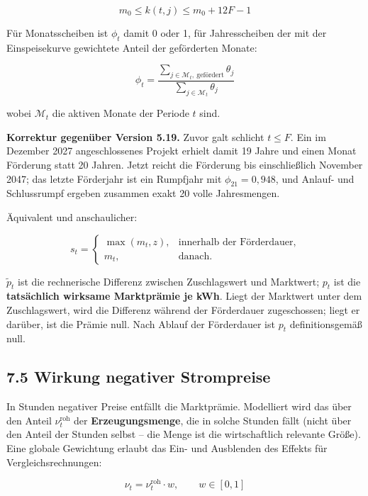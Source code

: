 \documentclass[
  a4paper,
  10pt]{article}
\renewenvironment{quote}
  {\begin{tcolorbox}[
      enhanced,
      breakable,
      colback=Wash,
      colframe=Brand,
      boxrule=0pt,
      leftrule=2.2pt,
      arc=0pt,
      left=8pt,right=8pt,top=6pt,bottom=6pt,
      before skip=8pt,after skip=9pt
    ]\small\color{InkSoft}}
  {\end{tcolorbox}}
\begin{document}
\[ m_0 \leq k(t,j) \leq m_0 + 12F - 1 \]

Für Monatsscheiben ist \(\phi_t\) damit 0 oder 1, für Jahresscheiben der
mit der Einspeisekurve gewichtete Anteil der geförderten Monate:

\[ \phi_t = \frac{\sum_{j \in \mathcal{M}_t,\ \text{gefördert}} \theta_j}{\sum_{j \in \mathcal{M}_t} \theta_j} \]

wobei \(\mathcal{M}_t\) die aktiven Monate der Periode \(t\) sind.

\begin{quote}
\textbf{Korrektur gegenüber Version 5.19.} Zuvor galt schlicht
\(t \leq F\). Ein im Dezember 2027 angeschlossenes Projekt erhielt damit
19 Jahre und einen Monat Förderung statt 20 Jahren. Jetzt reicht die
Förderung bis einschließlich November 2047; das letzte Förderjahr ist
ein Rumpfjahr mit \(\phi_{21} = 0{,}948\), und Anlauf- und Schlussrumpf
ergeben zusammen exakt 20 volle Jahresmengen.
\end{quote}

Äquivalent und anschaulicher:

\[
s_t=
\begin{cases}
\max(m_t,z), & \text{innerhalb der Förderdauer},\\
m_t, & \text{danach.}
\end{cases}
\]

\(\widetilde{p}_t\) ist die rechnerische Differenz zwischen
Zuschlagswert und Marktwert; \(p_t\) ist die \textbf{tatsächlich
wirksame Marktprämie je kWh}. Liegt der Marktwert unter dem
Zuschlagswert, wird die Differenz während der Förderdauer zugeschossen;
liegt er darüber, ist die Prämie null. Nach Ablauf der Förderdauer ist
\(p_t\) definitionsgemäß null.

\hypertarget{wirkung-negativer-strompreise}{%
\subsection{7.5 Wirkung negativer
Strompreise}\label{wirkung-negativer-strompreise}}

In Stunden negativer Preise entfällt die Marktprämie. Modelliert wird
das über den Anteil \(\nu^{\mathrm{roh}}_t\) der
\textbf{Erzeugungsmenge}, die in solche Stunden fällt (nicht über den
Anteil der Stunden selbst -- die Menge ist die wirtschaftlich relevante
Größe). Eine globale Gewichtung erlaubt das Ein- und Ausblenden des
Effekts für Vergleichsrechnungen:

\[ \nu_t = \nu^{\mathrm{roh}}_t \cdot w, \qquad w \in [0,1] \]
\end{document}

